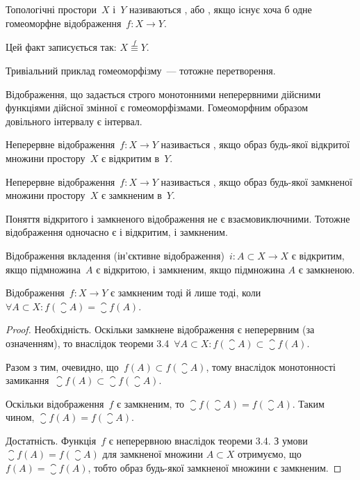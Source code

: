 \begin{definition}
Топологічні простори~$X$ і~$Y$ називаються
, або , якщо
існує хоча б одне гомеоморфне відображення~$f: X \to Y$.
\end{definition}

Цей факт записується так: $X \overset{f}{\equiv} Y$.

\begin{example}
Тривіальний приклад гомеоморфізму~--- тотожне перетворення.
\end{example}

\begin{example}
Відображення, що задається строго монотонними неперервними дійсними функціями дійсної
змінної є гомеоморфізмами. Гомеоморфним образом довільного інтервалу є інтервал.
\end{example}

\begin{definition}
Неперервне відображення~$f: X \to Y$
називається , якщо образ будь-якої відкритої
множини простору~$X$ є відкритим в~$Y$.
\end{definition}

\begin{definition}
Неперервне відображення~$f: X \to Y$
називається , якщо образ будь-якої замкненої
множини простору~$X$ є замкненим в~$Y$.
\end{definition}

\begin{remark}
Поняття відкритого і замкненого відображення не є
взаємовиключними. Тотожне відображення одночасно є і
відкритим, і замкненим.
\end{remark}

\begin{example}
Відображення вкладення (ін'єктивне
відображення)~$i: A \subset X \to X$ є відкритим, якщо
підмножина~$A$ є відкритою, і замкненим, якщо підмножина
$A$ є замкненою.
\end{example}

\begin{theorem}
Відображення~$f: X \to Y$ є замкненим тоді
й лише тоді, коли~$\forall A \subset X: f(\closure{A}) = \closure{f(A)}$.
\end{theorem}

\begin{proof}
Необхідність. Оскільки замкнене
відображення є неперервним (за означенням), то внаслідок
теореми 3.4~$\forall A \subset X: f(\closure{A}) \subset \closure{f(A)}$.

Разом з тим, очевидно, що~$f(A) \subset f(\closure{A})$, тому внаслідок
монотонності замикання~$\closure{f(A)} \subset \closure{f(\closure{A})}$.

Оскільки відображення~$f$ є замкненим, то
$\closure{f(\closure{A})} = f(\closure{A})$. Таким чином,
$\closure{f(A)} = f(\closure{A})$.

Достатність. Функція~$f$ є неперервною внаслідок
теореми 3.4. З умови~$\closure{f(A)} = f(\closure{A})$ для замкненої множини
$A \subset X$ отримуємо, що~$f(A) = \closure{f(A)}$, тобто образ будь-якої
замкненої множини є замкненим.
\end{proof}

